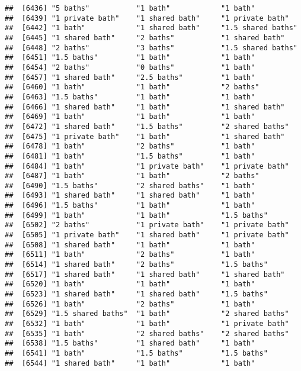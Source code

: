 \documentclass[
]{article}
\begin{document}
\begin{verbatim}
##  [6436] "5 baths"           "1 bath"            "1 bath"           
##  [6439] "1 private bath"    "1 shared bath"     "1 private bath"   
##  [6442] "1 bath"            "1 shared bath"     "1.5 shared baths" 
##  [6445] "1 shared bath"     "2 baths"           "1 shared bath"    
##  [6448] "2 baths"           "3 baths"           "1.5 shared baths" 
##  [6451] "1.5 baths"         "1 bath"            "1 bath"           
##  [6454] "2 baths"           "0 baths"           "1 bath"           
##  [6457] "1 shared bath"     "2.5 baths"         "1 bath"           
##  [6460] "1 bath"            "1 bath"            "2 baths"          
##  [6463] "1.5 baths"         "1 bath"            "1 bath"           
##  [6466] "1 shared bath"     "1 bath"            "1 shared bath"    
##  [6469] "1 bath"            "1 bath"            "1 bath"           
##  [6472] "1 shared bath"     "1.5 baths"         "2 shared baths"   
##  [6475] "1 private bath"    "1 bath"            "1 shared bath"    
##  [6478] "1 bath"            "2 baths"           "1 bath"           
##  [6481] "1 bath"            "1.5 baths"         "1 bath"           
##  [6484] "1 bath"            "1 private bath"    "1 private bath"   
##  [6487] "1 bath"            "1 bath"            "2 baths"          
##  [6490] "1.5 baths"         "2 shared baths"    "1 bath"           
##  [6493] "1 shared bath"     "1 shared bath"     "1 bath"           
##  [6496] "1.5 baths"         "1 bath"            "1 bath"           
##  [6499] "1 bath"            "1 bath"            "1.5 baths"        
##  [6502] "2 baths"           "1 private bath"    "1 private bath"   
##  [6505] "1 private bath"    "1 shared bath"     "1 private bath"   
##  [6508] "1 shared bath"     "1 bath"            "1 bath"           
##  [6511] "1 bath"            "2 baths"           "1 bath"           
##  [6514] "1 shared bath"     "2 baths"           "1.5 baths"        
##  [6517] "1 shared bath"     "1 shared bath"     "1 shared bath"    
##  [6520] "1 bath"            "1 bath"            "1 bath"           
##  [6523] "1 shared bath"     "1 shared bath"     "1.5 baths"        
##  [6526] "1 bath"            "2 baths"           "1 bath"           
##  [6529] "1.5 shared baths"  "1 bath"            "2 shared baths"   
##  [6532] "1 bath"            "1 bath"            "1 private bath"   
##  [6535] "1 bath"            "2 shared baths"    "2 shared baths"   
##  [6538] "1.5 baths"         "1 shared bath"     "1 bath"           
##  [6541] "1 bath"            "1.5 baths"         "1.5 baths"        
##  [6544] "1 shared bath"     "1 bath"            "1 bath"           

\end{verbatim}
\end{document}
